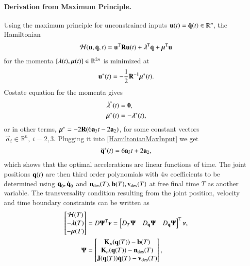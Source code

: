 \paragraph{\textbf{Derivation from Maximum Principle}.} Using the maximum principle for unconstrained inputs $\boldsymbol{\mathrm{u}}(t) = \ddot{\boldsymbol{\mathrm{q}}}(t) \in \mathbb{R}^{n}$, the Hamiltonian 
%
\begin{align}
\mathcal{H}(\boldsymbol{\mathrm{u}},\dot{\boldsymbol{\mathrm{q}}},t) = \boldsymbol{\mathrm{u}}^{\mathrm{T}}\boldsymbol{\mathrm{R}}\boldsymbol{\mathrm{u}}(t) + \boldsymbol{\mathrm{\lambda}}^{\mathrm{T}}\dot{\boldsymbol{\mathrm{q}}} + \boldsymbol{\mathrm{\mu}}^{\mathrm{T}}\boldsymbol{\mathrm{u}}
\end{align}
%
\noindent for the momenta $[\boldsymbol{\mathrm{\lambda}}(t),\boldsymbol{\mathrm{\mu}}(t)] \in \mathbb{R}^{2n}$ is minimized at 
%
\begin{align}
\boldsymbol{\mathrm{u}}^{*}(t) = -\frac{1}{2} \boldsymbol{\mathrm{R}}^{-1}\boldsymbol{\mathrm{\mu}}^{*}(t).
\label{HamiltonianMaxInput}
\end{align}
%
Costate equation for the momenta gives
%
\begin{align}
\dot{\boldsymbol{\mathrm{\lambda}}}^{*}(t) &= \boldsymbol{\mathrm{0}}, \\
\dot{\boldsymbol{\mathrm{\mu}}}^{*}(t) &= -\boldsymbol{\mathrm{\lambda}}^{*}(t),
\end{align}
%
\noindent or in other terms, $\boldsymbol{\mathrm{\mu}}^{*} = -2\boldsymbol{\mathrm{R}}(6\boldsymbol{\mathrm{a}}_3t - 2\boldsymbol{\mathrm{a}}_2)$, for some constant vectors $\ \vec{a}_i \in \mathbb{R}^{n}, \ i = 2, 3$. Plugging it into \eqref{HamiltonianMaxInput} we get
%
\begin{align}
\ddot{\boldsymbol{\mathrm{q}}}^{*}(t) = 6\boldsymbol{\mathrm{a}}_3t + 2\boldsymbol{\mathrm{a}}_2,
\end{align}
%
\noindent which shows that the optimal accelerations are linear functions of time. The joint positions $\boldsymbol{\mathrm{q}}(t)$ are then third order polynomials with $4n$ coefficients to be determined using $\boldsymbol{\mathrm{q}}_0, \dot{\boldsymbol{\mathrm{q}}}_0$ and $\boldsymbol{\mathrm{n}}_{\mathrm{des}}(T), \boldsymbol{\mathrm{b}}(T), \boldsymbol{\mathrm{v}}_{\mathrm{des}}(T)$ at free final time $T$ as another variable. The transversality condition resulting from the joint position, velocity and time boundary constraints can be written as
%
\begin{align}
\begin{bmatrix}
\mathcal{H}(T) \\
-\boldsymbol{\mathrm{\lambda}}(T) \\
-\boldsymbol{\mathrm{\mu}}(T)
\end{bmatrix} &= D\boldsymbol{\mathrm{\Psi}}^{\mathrm{T}}\boldsymbol{\mathrm{\nu}} = \begin{bmatrix}
D_{T}\boldsymbol{\mathrm{\Psi}} & D_{\boldsymbol{\mathrm{q}}}\boldsymbol{\mathrm{\Psi}} & D_{\dot{\boldsymbol{\mathrm{q}}}}\boldsymbol{\mathrm{\Psi}}
\end{bmatrix}^{\mathrm{T}}\boldsymbol{\mathrm{\nu}}, \label{transversality}\\
\boldsymbol{\mathrm{\Psi}} &= \begin{bmatrix}
\boldsymbol{\mathrm{K}}_{p}(\boldsymbol{\mathrm{q}}(T)) - \boldsymbol{\mathrm{b}}(T) \\ \boldsymbol{\mathrm{K}}_n(\boldsymbol{\mathrm{q}}(T)) - \boldsymbol{\mathrm{n}}_{\mathrm{des}}(T) \\ \boldsymbol{\mathrm{J}}(\boldsymbol{\mathrm{q}}(T))\dot{\boldsymbol{\mathrm{q}}}(T) - \boldsymbol{\mathrm{v}}_{\mathrm{des}}(T)
\end{bmatrix}, \nonumber
\end{align}
